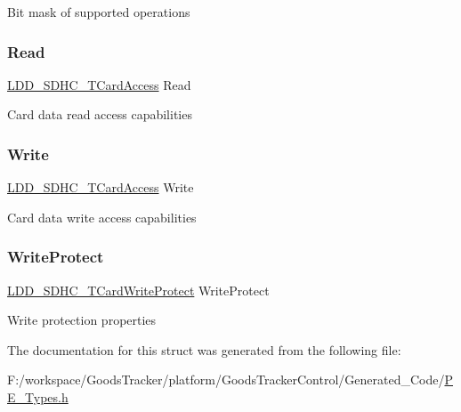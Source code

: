 Bit mask of supported operations \mbox{\label{struct_l_d_d___s_d_h_c___t_card_caps_a7c6dd192919744c09c982a7b3c72965c}} 
\subsubsection{\texorpdfstring{Read}{Read}}
{\footnotesize\ttfamily \hyperlink{struct_l_d_d___s_d_h_c___t_card_access}{L\+D\+D\+\_\+\+S\+D\+H\+C\+\_\+\+T\+Card\+Access} Read}

Card data read access capabilities \mbox{\label{struct_l_d_d___s_d_h_c___t_card_caps_a997a0766d91af68ac02e376ca5933685}} 
\subsubsection{\texorpdfstring{Write}{Write}}
{\footnotesize\ttfamily \hyperlink{struct_l_d_d___s_d_h_c___t_card_access}{L\+D\+D\+\_\+\+S\+D\+H\+C\+\_\+\+T\+Card\+Access} Write}

Card data write access capabilities \mbox{\label{struct_l_d_d___s_d_h_c___t_card_caps_a4900bef5123e165646fe1f68a983dd55}} 
\subsubsection{\texorpdfstring{Write\+Protect}{WriteProtect}}
{\footnotesize\ttfamily \hyperlink{struct_l_d_d___s_d_h_c___t_card_write_protect}{L\+D\+D\+\_\+\+S\+D\+H\+C\+\_\+\+T\+Card\+Write\+Protect} Write\+Protect}

Write protection properties 

The documentation for this struct was generated from the following file\+:\begin{DoxyCompactItemize}
\item 
F\+:/workspace/\+Goods\+Tracker/platform/\+Goods\+Tracker\+Control/\+Generated\+\_\+\+Code/\hyperlink{_p_e___types_8h}{P\+E\+\_\+\+Types.\+h}\end{DoxyCompactItemize}
